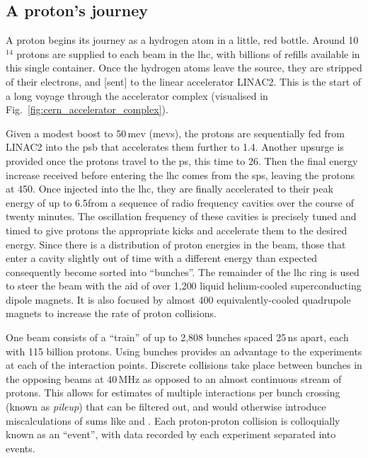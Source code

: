 

\subsection{A proton's journey}
\label{subsec:protons_journey}

A proton begins its journey as a hydrogen atom in a little, red bottle. Around 10$^{\text{14}}$ protons are supplied to each beam in the \acrshort{lhc}, with billions of refills available in this single container. Once the hydrogen atoms leave the source, they are stripped of their electrons, and [sent] to the linear accelerator LINAC2. This is the start of a long voyage through the accelerator complex (visualised in Fig.~\ref{fig:cern_accelerator_complex}).

Given a modest boost to 50\,\acrshort{mev} (\acrlong{mev}s), the protons are sequentially fed from LINAC2 into the \acrfull{psb} that accelerates them further to 1.4\GeV. Another upsurge is provided once the protons travel to the \acrfull{ps}, this time to 26\GeV. Then the final energy increase received before entering the \acrshort{lhc} comes from the \acrfull{sps}, leaving the protons at 450\GeV. Once injected into the \acrshort{lhc}, they are finally accelerated to their peak energy of up to 6.5\TeV from a sequence of radio frequency cavities over the course of twenty minutes. The oscillation frequency of these cavities is precisely tuned and timed to give protons the appropriate kicks and accelerate them to the desired energy. Since there is a distribution of proton energies in the beam, those that enter a cavity slightly out of time with a different energy than expected consequently become sorted into ``bunches''. The remainder of the \acrshort{lhc} ring is used to steer the beam with the aid of over 1,200 liquid helium-cooled superconducting dipole magnets. It is also focused by almost 400 equivalently-cooled quadrupole magnets to increase the rate of proton collisions.

One beam consists of a ``train'' of up to 2,808 bunches spaced 25\,ns apart, each with 115 billion protons. Using bunches provides an advantage to the experiments at each of the interaction points. Discrete collisions take place between bunches in the opposing beams at 40\,MHz as opposed to an almost continuous stream of protons. This allows for estimates of multiple interactions per bunch crossing (known as \emph{\gls{pileup}}) that can be filtered out, and would otherwise introduce miscalculations of sums like \ptmiss and \HT. Each proton-proton collision is colloquially known as an ``event'', with data recorded by each experiment separated into events.

